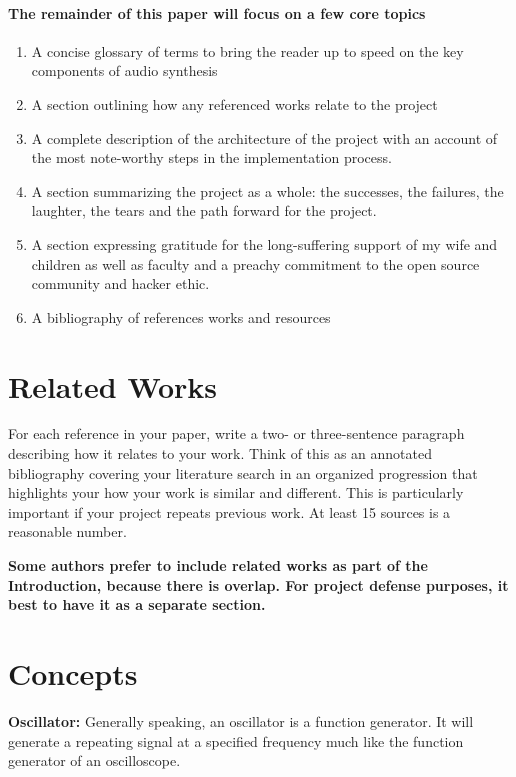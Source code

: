 \documentclass[acmlarge,screen]{acmart}
\begin{document}
	\paragraph{The remainder of this paper will focus on a few core topics}
	\begin{enumerate}
		\item A concise glossary of terms to bring the reader up to speed on the key components of audio synthesis
		\item A section outlining how any referenced works relate to the project
		\item A complete description of the architecture of the project with an account of the most note-worthy steps in the implementation process. 
		\item A section summarizing the project as a whole: the successes, the failures, the laughter, the tears and the path forward for the project.
		\item A section expressing gratitude for the long-suffering support of my wife and children as well as faculty and a preachy commitment to the open source community and hacker ethic.
		\item A bibliography of references works and resources
	\end{enumerate}

\section{Related Works}
For each reference in your paper, write a two- or three-sentence paragraph 
describing how it relates to your work. Think of this as an annotated bibliography
covering your literature search in an organized progression that highlights your 
how your work is similar and different. This is particularly important if your project repeats
previous work. At least 15 sources is a reasonable number.

\textbf{Some authors prefer to include related works as part of the Introduction, because there
is overlap. For project defense purposes, it best to have it as a separate section.}

\section{Concepts}
	\textbf{Oscillator:} Generally speaking, an oscillator is a function generator. It will generate a repeating signal at a specified frequency much like the function generator of an oscilloscope.
\end{document}
